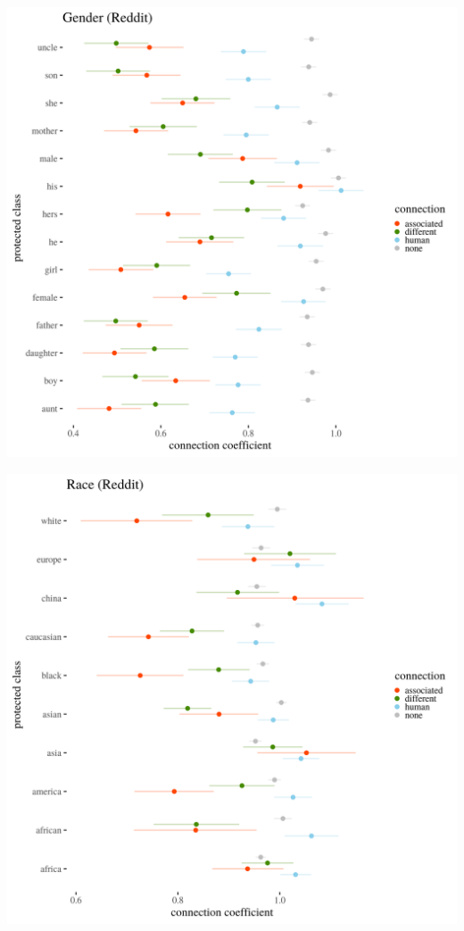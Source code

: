 \documentclass[
  12pt,
]{book}
\begin{document}
\includegraphics[width=14cm]{../images/visGenderReddit.png}

\includegraphics[width=14cm]{../images/visRaceReddit.png}
\end{document}
